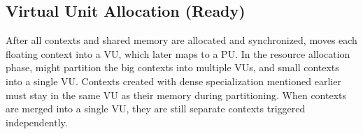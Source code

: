 \subsection{Virtual Unit Allocation (Ready)}
After all contexts and shared memory are allocated and synchronized, 
\name moves each floating context into a VU, which later maps to a PU.
In the resource allocation phase, \name might partition the big contexts into multiple VUs, and small contexts into a single VU. 
Contexts created with dense specialization mentioned earlier must stay in the same VU as their
memory during partitioning.
When contexts are merged into a single VU, they are still
separate contexts triggered independently.
